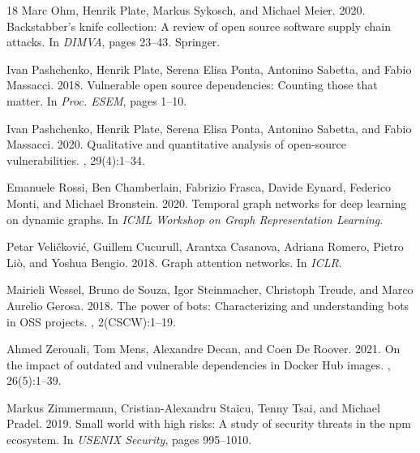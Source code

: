 \documentclass[sigconf,screen]{acmart}
\begin{document}
\begin{thebibliography}{18}
Marc Ohm, Henrik Plate, Markus Sykosch, and Michael Meier. 2020.
\newblock Backstabber's knife collection: A review of open source software supply chain attacks.
\newblock In {\em DIMVA}, pages 23--43. Springer.

Ivan Pashchenko, Henrik Plate, Serena Elisa Ponta, Antonino Sabetta, and Fabio Massacci. 2018.
\newblock Vulnerable open source dependencies: Counting those that matter.
\newblock In {\em Proc. ESEM}, pages 1--10.

Ivan Pashchenko, Henrik Plate, Serena Elisa Ponta, Antonino Sabetta, and Fabio Massacci. 2020.
\newblock Qualitative and quantitative analysis of open-source vulnerabilities.
, 29(4):1--34.

Emanuele Rossi, Ben Chamberlain, Fabrizio Frasca, Davide Eynard, Federico Monti, and Michael Bronstein. 2020.
\newblock Temporal graph networks for deep learning on dynamic graphs.
\newblock In {\em ICML Workshop on Graph Representation Learning}.

Petar Veli{\v{c}}kovi{\'c}, Guillem Cucurull, Arantxa Casanova, Adriana Romero, Pietro Li{\`o}, and Yoshua Bengio. 2018.
\newblock Graph attention networks.
\newblock In {\em ICLR}.

Mairieli Wessel, Bruno de Souza, Igor Steinmacher, Christoph Treude, and Marco Aurelio Gerosa. 2018.
\newblock The power of bots: Characterizing and understanding bots in OSS projects.
, 2(CSCW):1--19.

Ahmed Zerouali, Tom Mens, Alexandre Decan, and Coen De Roover. 2021.
\newblock On the impact of outdated and vulnerable dependencies in Docker Hub images.
, 26(5):1--39.

Markus Zimmermann, Cristian-Alexandru Staicu, Tenny Tsai, and Michael Pradel. 2019.
\newblock Small world with high risks: A study of security threats in the npm ecosystem.
\newblock In {\em USENIX Security}, pages 995--1010.

\end{thebibliography}
\end{document}
